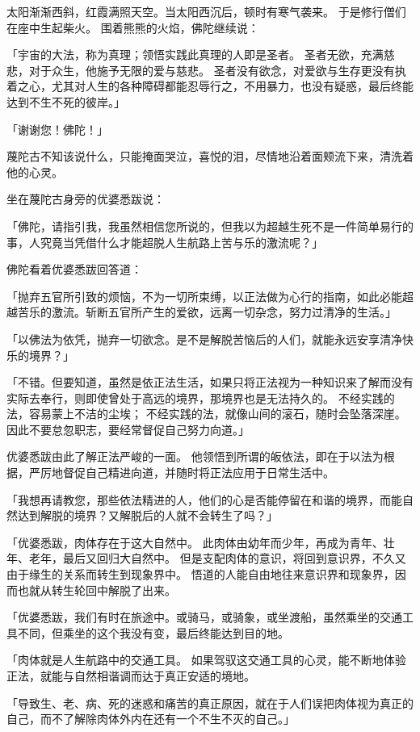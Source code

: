 \documentclass[twoside,openany]{book}
\begin{document}
太阳渐渐西斜，红霞满照天空。当太阳西沉后，顿时有寒气袭来。
于是修行僧们在座中生起柴火。
围着熊熊的火焰，佛陀继续说：

「宇宙的大法，称为真理；领悟实践此真理的人即是圣者。
圣者无欲，充满慈悲，对于众生，他施予无限的爱与慈悲。
圣者没有欲念，对爱欲与生存更没有执着之心，尤其对人生的各种障碍都能忍辱行之，不用暴力，也没有疑惑，最后终能达到不生不死的彼岸。」

「谢谢您！佛陀！」

蔑陀古不知该说什么，只能掩面哭泣，喜悦的泪，尽情地沿着面颊流下来，清洗着他的心灵。

坐在蔑陀古身旁的优婆悉跋说：

「佛陀，请指引我，我虽然相信您所说的，但我以为超越生死不是一件简单易行的事，人究竟当凭借什么才能超脱人生航路上苦与乐的激流呢？」

佛陀看着优婆悉跋回答道：

「抛弃五官所引致的烦恼，不为一切所束缚，以正法做为心行的指南，如此必能超越苦乐的激流。斩断五官所产生的爱欲，远离一切杂念，努力过清净的生活。」

「以佛法为依凭，抛弃一切欲念。是不是解脱苦恼后的人们，就能永远安享清净快乐的境界？」

「不错。但要知道，虽然是依正法生活，如果只将正法视为一种知识来了解而没有实际去奉行，则即使曾处于高远的境界，那境界也是无法持久的。
不经实践的法，容易蒙上不洁的尘埃；
不经实践的法，就像山间的滚石，随时会坠落深崖。
因此不要怠忽职志，要经常督促自己努力向道。」

优婆悉跋由此了解正法严峻的一面。
他领悟到所谓的皈依法，即在于以法为根据，严厉地督促自己精进向道，并随时将正法应用于日常生活中。

「我想再请教您，那些依法精进的人，他们的心是否能停留在和谐的境界，而能自然达到解脱的境界？又解脱后的人就不会转生了吗？」

「优婆悉跋，肉体存在于这大自然中。
此肉体由幼年而少年，再成为青年、壮年、老年，最后又回归大自然中。
但是支配肉体的意识，将回到意识界，不久又由于缘生的关系而转生到现象界中。
悟道的人能自由地往来意识界和现象界，因而也就从转生轮回中解脱了出来。

「优婆悉跋，我们有时在旅途中。或骑马，或骑象，或坐渡船，虽然乘坐的交通工具不同，但乘坐的这个我没有变，最后终能达到目的地。

「肉体就是人生航路中的交通工具。
如果驾驭这交通工具的心灵，能不断地体验正法，就能与自然相谐调而达于真正安适的境地。

「导致生、老、病、死的迷惑和痛苦的真正原因，就在于人们误把肉体视为真正的自己，而不了解除肉体外内在还有一个不生不灭的自己。」
\end{document}

